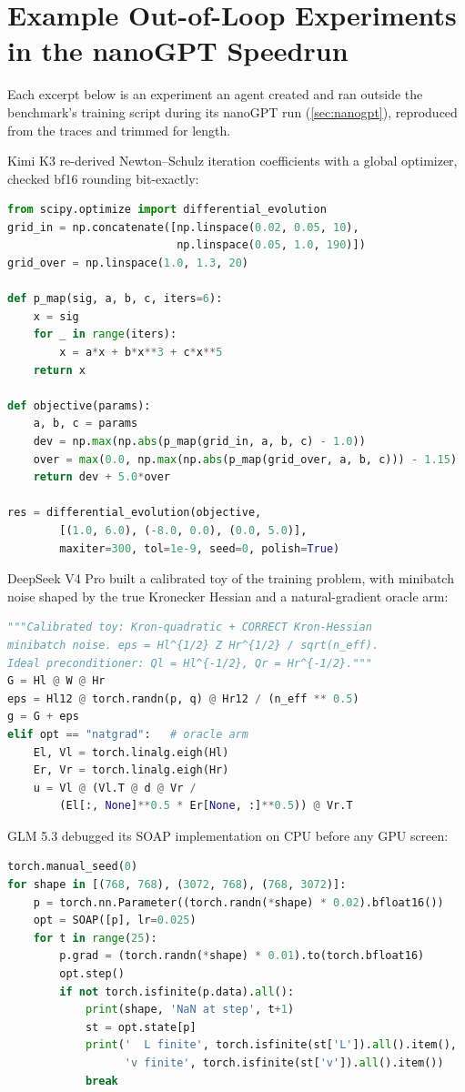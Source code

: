 \section{Example Out-of-Loop Experiments in the nanoGPT Speedrun}
\label{app:labexp}
Each excerpt below is an experiment an agent created and ran outside the benchmark's training script during its nanoGPT run (\cref{sec:nanogpt}), reproduced from the traces and trimmed for length.

Kimi K3 re-derived Newton--Schulz iteration coefficients with a global optimizer, checked bf16 rounding bit-exactly:
\begin{lstlisting}[language=Python]
from scipy.optimize import differential_evolution
grid_in = np.concatenate([np.linspace(0.02, 0.05, 10),
                          np.linspace(0.05, 1.0, 190)])
grid_over = np.linspace(1.0, 1.3, 20)

def p_map(sig, a, b, c, iters=6):
    x = sig
    for _ in range(iters):
        x = a*x + b*x**3 + c*x**5
    return x

def objective(params):
    a, b, c = params
    dev = np.max(np.abs(p_map(grid_in, a, b, c) - 1.0))
    over = max(0.0, np.max(np.abs(p_map(grid_over, a, b, c))) - 1.15)
    return dev + 5.0*over

res = differential_evolution(objective,
        [(1.0, 6.0), (-8.0, 0.0), (0.0, 5.0)],
        maxiter=300, tol=1e-9, seed=0, polish=True)
\end{lstlisting}

DeepSeek V4 Pro built a calibrated toy of the training problem, with minibatch noise shaped by the true Kronecker Hessian and a natural-gradient oracle arm:
\begin{lstlisting}[language=Python]
"""Calibrated toy: Kron-quadratic + CORRECT Kron-Hessian
minibatch noise. eps = Hl^{1/2} Z Hr^{1/2} / sqrt(n_eff).
Ideal preconditioner: Ql = Hl^{-1/2}, Qr = Hr^{-1/2}."""
G = Hl @ W @ Hr
eps = Hl12 @ torch.randn(p, q) @ Hr12 / (n_eff ** 0.5)
g = G + eps
elif opt == "natgrad":   # oracle arm
    El, Vl = torch.linalg.eigh(Hl)
    Er, Vr = torch.linalg.eigh(Hr)
    u = Vl @ (Vl.T @ d @ Vr /
        (El[:, None]**0.5 * Er[None, :]**0.5)) @ Vr.T
\end{lstlisting}

GLM 5.3 debugged its SOAP implementation on CPU before any GPU screen:
\begin{lstlisting}[language=Python]
torch.manual_seed(0)
for shape in [(768, 768), (3072, 768), (768, 3072)]:
    p = torch.nn.Parameter((torch.randn(*shape) * 0.02).bfloat16())
    opt = SOAP([p], lr=0.025)
    for t in range(25):
        p.grad = (torch.randn(*shape) * 0.01).to(torch.bfloat16)
        opt.step()
        if not torch.isfinite(p.data).all():
            print(shape, 'NaN at step', t+1)
            st = opt.state[p]
            print('  L finite', torch.isfinite(st['L']).all().item(),
                  'v finite', torch.isfinite(st['v']).all().item())
            break
\end{lstlisting}

